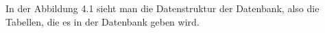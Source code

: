 In der Abbildung 4.1 sieht man die Datenstruktur der Datenbank, also die Tabellen, die es in der Datenbank geben wird.